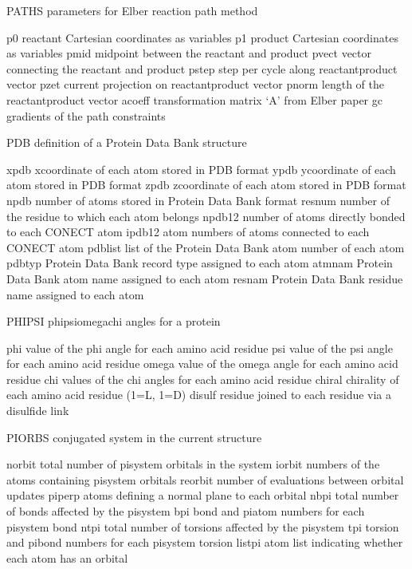 \documentclass[letterpaper,11pt,english]{sphinxmanual}
\begin{document}
PATHS   parameters for Elber reaction path method

p0      reactant Cartesian coordinates as variables
p1      product Cartesian coordinates as variables
pmid    midpoint between the reactant and product
pvect   vector connecting the reactant and product
pstep   step per cycle along reactant\sphinxhyphen{}product vector
pzet    current projection on reactant\sphinxhyphen{}product vector
pnorm   length of the reactant\sphinxhyphen{}product vector
acoeff  transformation matrix ‘A’ from Elber paper
gc      gradients of the path constraints

PDB     definition of a Protein Data Bank structure

xpdb    x\sphinxhyphen{}coordinate of each atom stored in PDB format
ypdb    y\sphinxhyphen{}coordinate of each atom stored in PDB format
zpdb    z\sphinxhyphen{}coordinate of each atom stored in PDB format
npdb    number of atoms stored in Protein Data Bank format
resnum  number of the residue to which each atom belongs
npdb12  number of atoms directly bonded to each CONECT atom
ipdb12  atom numbers of atoms connected to each CONECT atom
pdblist list of the Protein Data Bank atom number of each atom
pdbtyp  Protein Data Bank record type assigned to each atom
atmnam  Protein Data Bank atom name assigned to each atom
resnam  Protein Data Bank residue name assigned to each atom

PHIPSI  phi\sphinxhyphen{}psi\sphinxhyphen{}omega\sphinxhyphen{}chi angles for a protein

phi     value of the phi angle for each amino acid residue
psi     value of the psi angle for each amino acid residue
omega   value of the omega angle for each amino acid residue
chi     values of the chi angles for each amino acid residue
chiral  chirality of each amino acid residue (1=L, \sphinxhyphen{}1=D)
disulf  residue joined to each residue via a disulfide link

PIORBS  conjugated system in the current structure

norbit  total number of pisystem orbitals in the system
iorbit  numbers of the atoms containing pisystem orbitals
reorbit number of evaluations between orbital updates
piperp  atoms defining a normal plane to each orbital
nbpi    total number of bonds affected by the pisystem
bpi     bond and piatom numbers for each pisystem bond
ntpi    total number of torsions affected by the pisystem
tpi     torsion and pibond numbers for each pisystem torsion
listpi  atom list indicating whether each atom has an orbital
\end{document}
